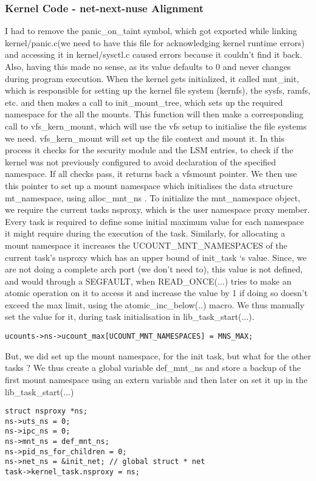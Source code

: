 \documentclass{sig-alternate}
\begin{document}
\subsubsection{Kernel Code - net-next-nuse Alignment}
I had to remove the panic\_on\_taint symbol, which got exported while linking kernel/panic.c(we need to have this file for acknowledging kernel 
runtime errors) and accessing it in kernel/sysctl.c caused errors because it couldn’t find it back. Also, having this made no sense, as its value 
defaults to 0 and never changes during program execution. When the kernel gets initialized, it called mnt\_init, which is responsible for setting 
up the kernel file system (kernfs), the sysfs, ramfs, etc. and then makes a call to init\_mount\_tree, which sets up the required namespace for the 
all the mounts. This function will then make a corresponding call to vfs\_kern\_mount, which will use the vfs setup to initialise the file systems 
we need. vfs\_kern\_mount will set up the file context and mount it. In this process it checks for the security module and the LSM entries, to check 
if the kernel was not previously configured to avoid declaration of the specified namespace. If all checks pass, it returns back a vfsmount 
pointer. We then use this pointer to set up a mount namespace which initialises the data structure mt\_namespace, using alloc\_mnt\_ns . To 
initialize the mnt\_namespace object, we require the current tasks nsproxy, which is the user namespace proxy member. Every task is required to 
define some initial maximum value for each namespace it might require during the execution of the task. Similarly, for allocating a mount 
namespace it increases the UCOUNT\_MNT\_NAMESPACES of the current task’s nsproxy which has an upper bound of init\_task ‘s value. Since, we are not 
doing a complete arch port (we don’t need to), this value is not defined, and would through a SEGFAULT, when READ\_ONCE(...) tries to make an 
atomic operation on it to access it and increase the value by 1 if doing so doesn’t exceed the max limit, using the atomic\_inc\_below(..)  macro. 
We thus manually set the value for it, during task initialisation in lib\_task\_start(...).  

\begin{lstlisting}[style=CStyle] 
ucounts->ns->ucount_max[UCOUNT_MNT_NAMESPACES] = MNS_MAX;
\end{lstlisting}

But, we did set up the mount namespace, for the init task, but what for the other tasks ? We thus create a global variable def\_mnt\_ns and 
store a backup of the first mount namespace using an extern variable and then later on set it up in the lib\_task\_start(...) 
\begin{lstlisting}[style=CStyle] 
struct nsproxy *ns;   
ns->uts_ns = 0;
ns->ipc_ns = 0;
ns->mnt_ns = def_mnt_ns;
ns->pid_ns_for_children = 0;
ns->net_ns = &init_net; // global struct * net   
task->kernel_task.nsproxy = ns;
\end{lstlisting}
\end{document}
